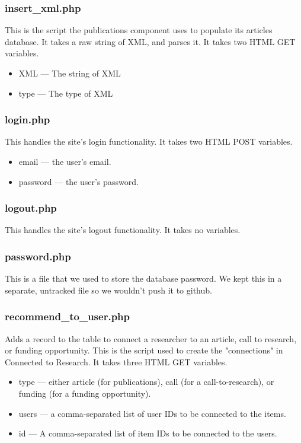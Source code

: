 \documentclass[onecolumn]{IEEEtran}
\begin{document}
\subsubsection{insert\_xml.php}
This is the script the publications component uses to populate its articles database. It takes a raw string of XML, and parses it. It takes two HTML GET variables. 
\begin{itemize}
    \item XML --- The string of XML 
    \item type --- The type of XML 
\end{itemize}    

\subsubsection{login.php}
This handles the site's login functionality. It takes two HTML POST variables. 
\begin{itemize}
    \item email --- the user's email. 
    \item password --- the user's password. 
\end{itemize}    


\subsubsection{logout.php}
This handles the site's logout functionality. It takes no variables. 

\subsubsection{password.php}
This is a file that we used to store the database password. We kept this in a separate, untracked file so we wouldn't push it to github. 

\subsubsection{recommend\_to\_user.php}
Adds a record to the table to connect a researcher to an article, call to research, or funding opportunity. This is the script used to create the "connections" in Connected to Research. It takes three HTML GET variables. 
\begin{itemize}
    \item type --- either article (for publications), call (for a call-to-research), or funding (for a funding opportunity). 
    \item users --- a comma-separated list of user IDs to be connected to the items. 
    \item id --- A comma-separated list of item IDs to be connected to the users. 
\end{itemize}    
\end{document}
